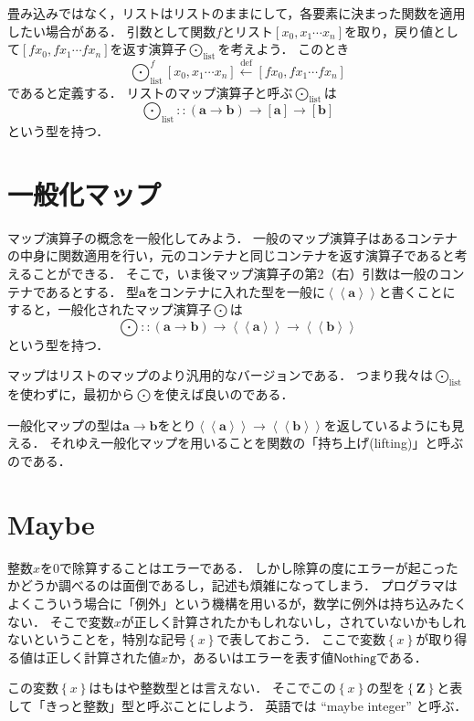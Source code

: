 \documentclass[twocolumn]{jsbook}
\newcommand{\defeq}{\xleftarrow{\text{def}}}
\newcommand{\mapfunc}{\bigodot} %
\newcommand{\typename}[1]{\bm{#1}}
\newcommand{\integertype}{\typename{Z}}
\newcommand{\generalcontainer}[1]{\left\langle\!\left\langle#1\right\rangle\!\right\rangle}
\newcommand{\listtype}[1]{\left[#1\right]}
\newcommand{\maybe}[1]{\left\{#1\right\}}
\newcommand{\specialkeyword}[1]{\textsf{#1}}
\newcommand{\nothing}{\specialkeyword{Nothing}}
\begin{document}
畳み込みではなく，リストはリストのままにして，各要素に決まった関数を適用したい場合がある．
引数として関数$f$とリスト$[x_0,x_1\dotsb x_n]$を取り，戻り値として$[fx_0,fx_1\dotsb fx_n]$を返す演算子$\mapfunc_\text{list}$を考えよう．
このとき$$\mapfunc^f_\text{list}[x_0,x_1\dotsb x_n]\defeq [fx_0,fx_1\dotsb fx_n]$$であると定義する．
リストのマップ演算子と呼ぶ$\mapfunc_\text{list}$は$$\mapfunc_\text{list}::(\typename{a}\rightarrow\typename{b})\rightarrow\listtype{\typename{a}}\rightarrow\listtype{\typename{b}}$$という型を持つ．


\section{一般化マップ}

マップ演算子の概念を一般化してみよう．
一般のマップ演算子はあるコンテナの中身に関数適用を行い，元のコンテナと同じコンテナを返す演算子であると考えることができる．
そこで，いま後マップ演算子の第2（右）引数は一般のコンテナであるとする．
型$\typename{a}$をコンテナに入れた型を一般に$\generalcontainer{\typename{a}}$と書くことにすると，一般化されたマップ演算子$\mapfunc$は$$\mapfunc::(\typename{a}\rightarrow\typename{b})\rightarrow\generalcontainer{\typename{a}}\rightarrow\generalcontainer{\typename{b}}$$という型を持つ．

マップはリストのマップのより汎用的なバージョンである．
つまり我々は$\mapfunc_\text{list}$を使わずに，最初から$\mapfunc$を使えば良いのである．

一般化マップの型は$\typename{a}\rightarrow\typename{b}$をとり$\generalcontainer{\typename{a}}\rightarrow\generalcontainer{\typename{b}}$を返しているようにも見える．
それゆえ一般化マップを用いることを関数の「持ち上げ(lifting)」と呼ぶのである．

\section{Maybe}

整数$x$を$0$で除算することはエラーである．
しかし除算の度にエラーが起こったかどうか調べるのは面倒であるし，記述も煩雑になってしまう．
プログラマはよくこういう場合に「例外」という機構を用いるが，数学に例外は持ち込みたくない．
そこで変数$x$が正しく計算されたかもしれないし，されていないかもしれないということを，特別な記号$\maybe{x}$で表しておこう．
ここで変数$\maybe{x}$が取り得る値は正しく計算された値$x$か，あるいはエラーを表す値$\nothing$である．

この変数$\maybe{x}$はもはや整数型とは言えない．
そこでこの$\maybe{x}$の型を$\maybe{\integertype}$と表して「きっと整数」型と呼ぶことにしよう．
英語では ``maybe integer'' と呼ぶ．
\end{document}

